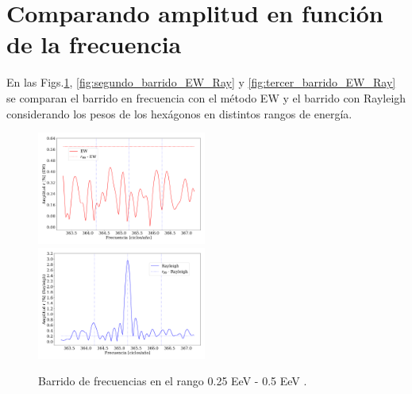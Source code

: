 \section{Comparando amplitud en función de la frecuencia}

En las Figs.\ref{fig:primer_barrido_EW_Ray}, \ref{fig:segundo_barrido_EW_Ray} y \ref{fig:tercer_barrido_EW_Ray} se comparan el barrido en frecuencia con el método EW y el barrido con Rayleigh considerando los pesos de los hexágonos en distintos rangos de energía.


\begin{figure}[H]
    \begin{small}
        \begin{center}
            \includegraphics[width=0.4955\textwidth]{plot_bin_1_barrido_v3_EW.pdf}
            \includegraphics[width=0.4955\textwidth]{plot_bin_1_barrido_v1_Ray.pdf}
        \end{center}
        \caption{Barrido de frecuencias en el rango 0.25 EeV - 0.5 EeV .}
        \label{fig:primer_barrido_EW_Ray}
    \end{small}
\end{figure}    

